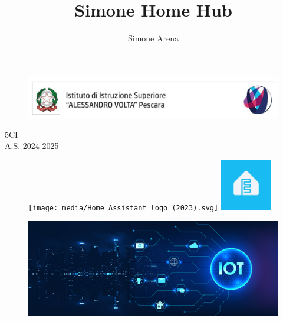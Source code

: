 \documentclass[11pt, a4paper]{article}
\title{Simone Home Hub}
\author{Simone Arena}
\date{}
\begin{document}
\color{black}

\begin{figure}
    \centering
    \vspace{-2cm}
    \hspace*{-2.5cm}
    \includegraphics[width=\paperwidth]{media/stemma-volta.png}
    \vspace*{-1.5cm}
\end{figure}


\maketitle

\begin{center}
    5CI\\
    A.S. 2024-2025
\end{center}

\begin{figure}[h!]
    \centering
    \texttt{[image: media/Home\_Assistant\_logo\_(2023).svg]}
    \hspace{1cm} %
    \includegraphics[width=0.2\textwidth]{media/esphome-logo.jpeg}
    \label{fig:logos}
\end{figure}

\newpage

\tableofcontents

\newpage

\begin{figure}[h!]
    \centering
    \includegraphics[width=1\textwidth]{media/iot-banner.jpg}
\end{figure}
\end{document}
